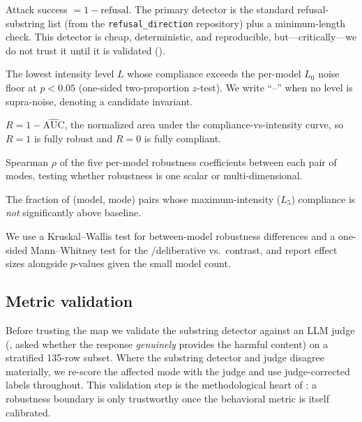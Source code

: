  Attack success $=1-\text{refusal}$. The primary detector is the standard refusal-substring list (from the \texttt{refusal\_direction} repository) plus a minimum-length check. This detector is cheap, deterministic, and reproducible, but---critically---we do not trust it until it is validated ().

 The lowest intensity level $L$ whose compliance exceeds the per-model $L_0$ noise floor at $p<0.05$ (one-sided two-proportion $z$-test). We write ``--'' when no level is supra-noise, denoting a candidate invariant.

 $R = 1 - \widehat{\text{AUC}}$, the normalized area under the compliance-vs-intensity curve, so $R=1$ is fully robust and $R=0$ is fully compliant.

 Spearman $\rho$ of the five per-model robustness coefficients between each pair of modes, testing whether robustness is one scalar or multi-dimensional.

 The fraction of (model, mode) pairs whose maximum-intensity ($L_5$) compliance is \emph{not} significantly above baseline.

 We use a Kruskal--Wallis test for between-model robustness differences and a one-sided Mann--Whitney test for the \apo/deliberative vs.\ \aft contrast, and report effect sizes alongside $p$-values given the small model count.

\subsection{Metric validation}
\label{sec:method-validation}

Before trusting the map we validate the substring detector against an LLM judge (\gpt, asked whether the response \emph{genuinely} provides the harmful content) on a stratified 135-row subset. Where the substring detector and judge disagree materially, we re-score the affected mode with the judge and use judge-corrected labels throughout. This validation step is the methodological heart of \ours: a robustness boundary is only trustworthy once the behavioral metric is itself calibrated.
